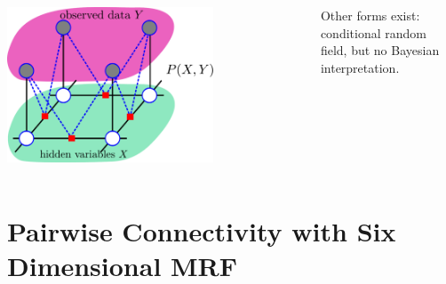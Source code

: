 \documentclass[sansserif, 10pt]{beamer}
\begin{document}
\begin{frame}
  \begin{columns}
    \begin{column}{0.5\textwidth}
      \centering
      \includegraphics[width = 0.7\textwidth]{sfig/crf}
      \end{column}
    \begin{column}{0.5\textwidth}
      \begin{block}{}

        Other forms exist: conditional random field, but no Bayesian
        interpretation.
      \end{block}
      \end{column}
    \end{columns}

\end{frame}







\section{Pairwise Connectivity with Six Dimensional MRF}
\end{document}
